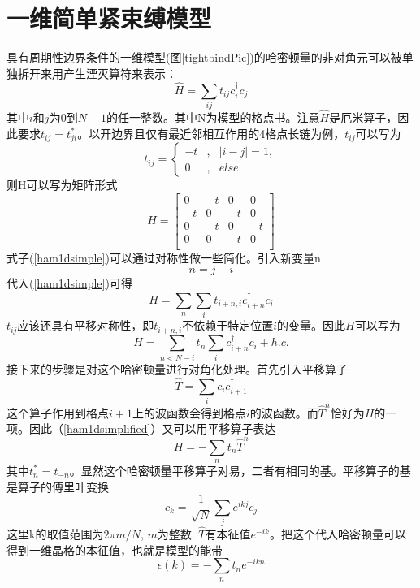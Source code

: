 \section{一维简单紧束缚模型}
具有周期性边界条件的一维模型(图\ref{tightbindPic})的哈密顿量的非对角元可以被单独拆开来用产生湮灭算符来表示：
\begin{equation}
  \hat{H} = \sum_{ij} t_{ij} c_{i}^{\dagger} c_j
  \label{ham1dsimple}
\end{equation}
其中$i$和$j$为$0$到$N-1$的任一整数。其中N为模型的格点书。注意$\hat{H}$是厄米算子，因此要求$t_{ij} = t^*_{ji}$。以开边界且仅有最近邻相互作用的4格点长链为例，$t_{ij}$可以写为
\begin{equation}
\label{eq6}
t_{ij}=\left\{
\begin{aligned}
-t & , & |i - j| = 1, \\
0 & , & else.
\end{aligned}
\right.
\end{equation}
则H可以写为矩阵形式
\begin{equation}
H =
\begin{bmatrix} 

    0 & -t & 0 & 0 \\
    -t & 0 & -t & 0 \\
    0 & -t & 0 & -t \\
    0 & 0 & -t & 0 \\
  \end{bmatrix}
 \end{equation}
式子(\ref{ham1dsimple})可以通过对称性做一些简化。引入新变量n
\begin{equation}
  n = j - i
\end{equation}
代入(\ref{ham1dsimple})可得
\begin{equation}
  H = \sum_{n} \sum_i t_{i+n, i} c_{i+n}^\dagger c_i
\end{equation}
$t_{ij}$应该还具有平移对称性，即$t_{i+n, i}$不依赖于特定位置$i$的变量。因此$H$可以写为
\begin{equation}
  H = \sum_{n < N - i} t_n \sum_i c_{i+n}^\dagger c_i + h.c.
  \label{ham1dsimplified}
\end{equation}
接下来的步骤是对这个哈密顿量进行对角化处理。首先引入平移算子
\begin{equation}
  \hat{T} = \sum_i c_i c^\dagger_{i + 1}
\end{equation}
这个算子作用到格点$i + 1$上的波函数会得到格点$i $的波函数。而$\hat{T}^n$恰好为$H$的一项。因此（\ref{ham1dsimplified}）又可以用平移算子表达
\begin{equation}
  H = - \sum_n t_n \hat{T}^n
\end{equation}
其中$t_n^* = t_{-n}$。显然这个哈密顿量平移算子对易，二者有相同的基。平移算子的基是算子的傅里叶变换
\begin{equation}
  c_k = \frac{1}{\sqrt{N}} \sum_j e^{ikj} c_j
\end{equation}
这里k的取值范围为$2 \pi m  / N$, $m$为整数. $\hat{T}$有本征值$e^{-ik}$。把这个代入哈密顿量可以得到一维晶格的本征值，也就是模型的能带
\begin{equation}
\epsilon(k) = - \sum_n t_n e^{-ikn}
\end{equation}

